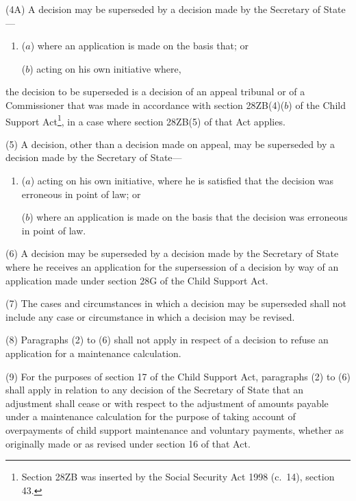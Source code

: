 \documentclass[12pt,a4paper]{article}
\begin{document}
{%
(4A) A decision may be superseded by a decision made by the Secretary of State—
\begin{enumerate}\item[]
($a$) where an application is made on the basis that; or

($b$) acting on his own initiative where,
\end{enumerate}
the decision to be superseded is a decision of an appeal tribunal or of a Commissioner that was made in accordance with section 28ZB(4)($b$)  of the Child Support Act\footnote{Section 28ZB was inserted by the Social Security Act 1998 (c.\ 14), section 43.}, in a case where section 28ZB(5) of that Act applies.

(5) A decision, other than a decision made on appeal, may be superseded by a decision made by the Secretary of State—
\begin{enumerate}\item[]
($a$) acting on his own initiative, where he is satisfied that the decision was erroneous in point of law; or

($b$) where an application is made on the basis that the decision was erroneous in point of law.
\end{enumerate}

(6) A decision may be superseded by a decision made by the Secretary of State where he receives an application for the supersession of a decision by way of an application made under section 28G of the Child Support Act.

(7) The cases and circumstances in which a decision may be superseded shall not include any case or circumstance in which a decision may be revised.

(8) Paragraphs (2) to (6) shall not apply in respect of a decision to refuse an application for a maintenance calculation.

(9) For the purposes of section 17 of the Child Support Act, paragraphs (2) to (6) shall apply in relation to any decision of the Secretary of State that an adjustment shall cease or with respect to the adjustment of amounts payable under a maintenance calculation for the purpose of taking account of overpayments of child support maintenance and voluntary payments, whether as originally made or as revised under section 16 of that Act.

}
\end{document}
